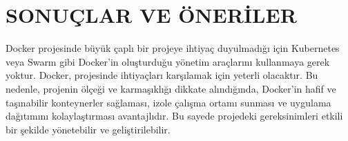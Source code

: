 \section{SONUÇLAR VE ÖNERİLER}
Docker projesinde büyük çaplı bir projeye ihtiyaç duyulmadığı için Kubernetes veya Swarm gibi Docker'in oluşturduğu yönetim araçlarını kullanmaya gerek yoktur. Docker, projesinde ihtiyaçları karşılamak için yeterli olacaktır. Bu nedenle, projenin ölçeği ve karmaşıklığı dikkate alındığında, Docker'in hafif ve taşınabilir konteynerler sağlaması, izole çalışma ortamı sunması ve uygulama dağıtımını kolaylaştırması avantajlıdır. Bu sayede projedeki gereksinimleri etkili bir şekilde yönetebilir ve geliştirilebilir.

